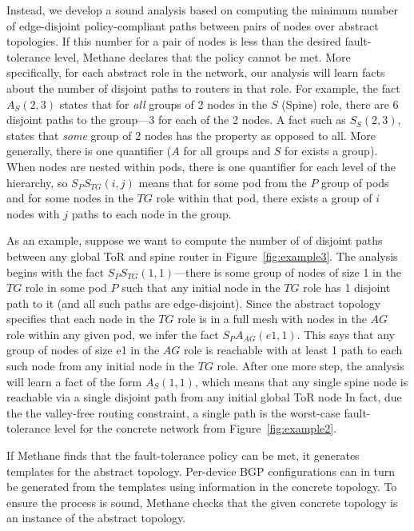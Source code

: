 \documentclass[numbers, 10pt, preprint]{sigplanconf}
\newcommand{\sysname}{{\small \sf Methane}\xspace}
\begin{document}
Instead, we develop a sound analysis based on computing the minimum
number of edge-disjoint policy-compliant paths between pairs of nodes
over abstract topologies. If this number for a pair of nodes is less
than the desired fault-tolerance level, \sysname declares that the
policy cannot be met.  More specifically,
for each abstract role in the network, our analysis will learn facts about the
number of disjoint paths to routers in that role.  For example,
the fact $A_{S}(2,3)$ states that for \emph{all} groups of 2 nodes
in the $S$ (Spine) role, there are 6 disjoint paths to the group---3 
for each of the 2 nodes. A fact such as $S_{S}(2,3)$, states that
\emph{some} group of 2 nodes has the property as opposed to all.
More generally, there is one quantifier ($A$ for all groups
and $S$ for exists a group).  When nodes are nested within pods,
there is one quantifier for each level of the hierarchy, so
$S_P S_{TG} (i,j)$ means that for some pod from the $P$ group of pods
and for some nodes in the $TG$ role within that pod, there exists a
group of $i$ nodes with $j$ paths to each node in the group.

As an example, suppose we want to compute the number of of disjoint paths 
between any
global ToR and spine router in Figure~\ref{fig:example3}.
The analysis begins with the fact
$S_P S_{TG} (1,1)$---there is some group of
nodes of size 1 in the $TG$ role in some pod $P$ such that any initial
node in the $TG$ role has 1 disjoint path to it (and all such paths are
edge-disjoint). Since the abstract topology specifies that each node in 
the $TG$ role is in
a full mesh with nodes in the $AG$ role within any given pod, we 
infer the fact $S_P A_{AG}(e1,1)$. This says that
any group of nodes of size e1 in the $AG$ role is reachable with at
least 1 path to each such node from any initial node in
the $TG$ role.
%
After one more step, the analysis will learn a fact of the form $A_{S}(1,1)$, which means that any single spine node is reachable via a single disjoint path from any initial global ToR node 
In fact, due the the valley-free routing constraint, a single path is 
the worst-case fault-tolerance level for the concrete network from 
Figure~\ref{fig:example2}.

If \sysname finds that the fault-tolerance policy can be met, it generates templates for the abstract topology.  Per-device BGP configurations can in turn be generated from the templates 
using information in the concrete topology. To ensure the process is sound, 
\sysname checks that the given concrete topology is an instance of the abstract topology.
\end{document}

